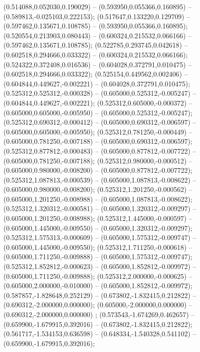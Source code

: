  (0.514088,0.052030,0.190029) -- (0.593950,0.055366,0.160895) -- (0.589813,-0.025103,0.222153);
 (0.517647,0.133220,0.129709) -- (0.597462,0.135671,0.108785) -- (0.593950,0.055366,0.160895);
 (0.520554,0.213903,0.080443) -- (0.600324,0.215532,0.066166) -- (0.597462,0.135671,0.108785);
 (0.522785,0.293745,0.042618) -- (0.602518,0.294666,0.033322) -- (0.600324,0.215532,0.066166);
 (0.524322,0.372408,0.016536) -- (0.604028,0.372791,0.010475) -- (0.602518,0.294666,0.033322);
 (0.525154,0.449562,0.002406) -- (0.604844,0.449627,-0.002221) -- (0.604028,0.372791,0.010475);
 (0.525312,0.525312,-0.000328) -- (0.605000,0.525312,-0.005247) -- (0.604844,0.449627,-0.002221);
 (0.525312,0.605000,-0.000372) -- (0.605000,0.605000,-0.005950) -- (0.605000,0.525312,-0.005247);
 (0.525312,0.690312,-0.000412) -- (0.605000,0.690312,-0.006597) -- (0.605000,0.605000,-0.005950);
 (0.525312,0.781250,-0.000449) -- (0.605000,0.781250,-0.007188) -- (0.605000,0.690312,-0.006597);
 (0.525312,0.877812,-0.000483) -- (0.605000,0.877812,-0.007722) -- (0.605000,0.781250,-0.007188);
 (0.525312,0.980000,-0.000512) -- (0.605000,0.980000,-0.008200) -- (0.605000,0.877812,-0.007722);
 (0.525312,1.087813,-0.000539) -- (0.605000,1.087813,-0.008622) -- (0.605000,0.980000,-0.008200);
 (0.525312,1.201250,-0.000562) -- (0.605000,1.201250,-0.008988) -- (0.605000,1.087813,-0.008622);
 (0.525312,1.320312,-0.000581) -- (0.605000,1.320312,-0.009297) -- (0.605000,1.201250,-0.008988);
 (0.525312,1.445000,-0.000597) -- (0.605000,1.445000,-0.009550) -- (0.605000,1.320312,-0.009297);
 (0.525312,1.575313,-0.000609) -- (0.605000,1.575312,-0.009747) -- (0.605000,1.445000,-0.009550);
 (0.525312,1.711250,-0.000618) -- (0.605000,1.711250,-0.009888) -- (0.605000,1.575312,-0.009747);
 (0.525312,1.852812,-0.000623) -- (0.605000,1.852812,-0.009972) -- (0.605000,1.711250,-0.009888);
 (0.525312,2.000000,-0.000625) -- (0.605000,2.000000,-0.010000) -- (0.605000,1.852812,-0.009972);
 (0.587857,-1.828648,0.252129) -- (0.673802,-1.832415,0.212822) -- (0.690312,-2.000000,0.000000);
 (0.605000,-2.000000,0.000000) -- (0.690312,-2.000000,0.000000) ;
 (0.573543,-1.674269,0.462657) -- (0.659900,-1.679915,0.392016) -- (0.673802,-1.832415,0.212822);
 (0.561717,-1.534153,0.636598) -- (0.648334,-1.540328,0.541102) -- (0.659900,-1.679915,0.392016);
